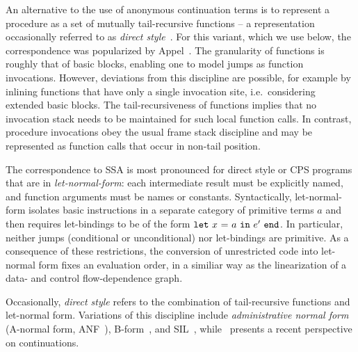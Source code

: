 An alternative to the use of anonymous continuation terms is to
represent a procedure as a set of mutually tail-recursive functions --
a representation occasionally referred to as \emph{direct
style}~\cite{Reynolds1974}. For this variant, which we use below, the
correspondence was popularized by Appel~\cite{Appel98:SSA}. The
granularity of functions is roughly that of basic blocks, enabling one
to model jumps as function invocations. However, deviations from this
discipline are possible, for example by inlining functions that have
only a single invocation site, i.e.~considering extended basic blocks.
The tail-recursiveness of functions implies that no invocation stack
needs to be maintained for such local function calls. In contrast,
procedure invocations obey the usual frame stack discipline and may be
represented as function calls that occur in non-tail position.

The correspondence to SSA is most pronounced for direct style or CPS
programs that are in \emph{let-normal-form}: each intermediate result
must be explicitly named, and function arguments must be names or
constants. Syntactically, let-normal-form isolates basic instructions
in a separate category of primitive terms $a$ and then requires
let-bindings to be of the form $\mathtt{let}\ {x}\ \mathtt{=}\ {a}\ \mathtt{in}\ {e'}\ \mathtt{end}$.  In particular,
neither jumps (conditional or unconditional) nor let-bindings are
primitive. As a consequence of these restrictions, the conversion of
unrestricted code into let-normal form fixes an evaluation order, in a
similiar way as the linearization of a data- and control
flow-dependence graph.


Occasionally, \emph{direct style} refers to the combination of
tail-recursive functions and let-normal form. Variations of this
discipline include
\emph{administrative normal form} (A-normal form, ANF~\cite{DBLP:conf/pldi/FlanaganSDF93}), B-form~\cite{DBLP:conf/pldi/TarditiMCSHL96}, and SIL~\cite{DBLP:journals/jfp/TolmachO98}, while~\cite{DBLP:conf/icfp/Kennedy07} presents a recent perspective on continuations. 

